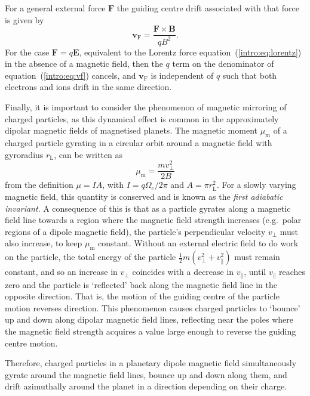 For a general external force $\boldsymbol{F}$ the guiding centre drift associated with that force is given by
\begin{equation}\label{intro:eq:vf}
\boldsymbol{v}_\mathrm{F} = \frac{\boldsymbol{F}\times\boldsymbol{B}}{qB^2}.
\end{equation}
For the case $\boldsymbol{F} = q\boldsymbol{E}$, equivalent to the Lorentz force equation~(\ref{intro:eq:lorentz}) in the absence of a magnetic field, then the $q$ term on the denominator of equation~(\ref{intro:eq:vf}) cancels, and $\boldsymbol{v}_\mathrm{F}$ is independent of $q$ such that both electrons and ions drift in the same direction.

Finally, it is important to consider the phenomenon of magnetic mirroring of charged particles, as this dynamical effect is common in the approximately dipolar magnetic fields of magnetised planets. The magnetic moment $\mu_\mathrm{m}$ of a charged particle gyrating in a circular orbit around a magnetic field with gyroradius $r_\mathrm{L}$, can be written as
\begin{equation}
\mu_\mathrm{m} = \frac{mv_\perp^2}{2B}
\end{equation}
from the definition $\mu = IA$, with $I = q\Omega_\mathrm{c}/2\pi$ and $A = \pi r_\mathrm{L}^2$. For a slowly varying magnetic field, this quantity is conserved and is known as the \textit{first adiabatic invariant}. A consequence of this is that as a particle gyrates along a magnetic field line towards a region where the magnetic field strength increases (e.g.\ polar regions of a dipole magnetic field), the particle's perpendicular velocity $v_\perp$ must also increase, to keep $\mu_\mathrm{m}$ constant. Without an external electric field to do work on the particle, the total energy of the particle $\frac{1}{2}m(v_\perp^2+v_\parallel^2)$ must remain constant, and so an increase in $v_\perp$ coincides with a decrease in $v_\parallel$, until $v_\parallel$ reaches zero and the particle is `reflected' back along the magnetic field line in the opposite direction. That is, the motion of the guiding centre of the particle motion reverses direction. This phenomenon causes charged particles to `bounce' up and down along dipolar magnetic field lines, reflecting near the poles where the magnetic field strength acquires a value large enough to reverse the guiding centre motion. 

Therefore, charged particles in a planetary dipole magnetic field simultaneously gyrate around the magnetic field lines, bounce up and down along them, and drift azimuthally around the planet in a direction depending on their charge.

